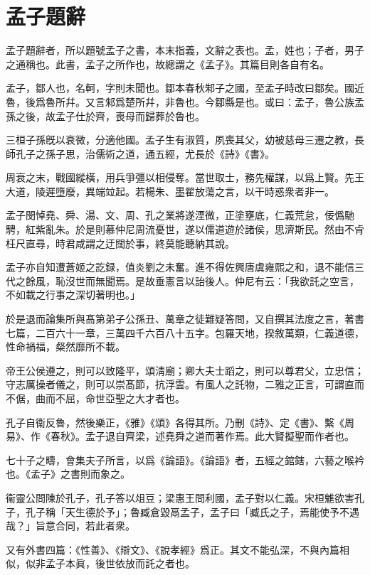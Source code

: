 \chapter*{孟子題辭}

孟子題辭者，所以題號孟子之書，本末指義，文辭之表也。孟，姓也；子者，男子之通稱也。此書，孟子之所作也，故總謂之《孟子》。其篇目則各自有名。

孟子，鄒人也，名軻，字則未聞也。鄒本春秋邾子之國，至孟子時改曰鄒矣。國近魯，後爲魯所幷。又言邾爲楚所幷，非魯也。今鄒縣是也。或曰：孟子，魯公族孟孫之後，故孟子仕於齊，喪母而歸葬於魯也。

三桓子孫旣以衰微，分適他國。孟子生有淑質，夙喪其父，幼被慈母三遷之教，長師孔子之孫子思，治儒術之道，通五經，尤長於《詩》《書》。

周衰之末，戰國縱橫，用兵爭彊以相侵奪。當世取士，務先權謀，以爲上賢。先王大道，陵遲墮廢，異端竝起。若楊朱、墨翟放蕩之言，以干時惑衆者非一。

孟子閔悼堯、舜、湯、文、周、孔之業將遂湮微，正塗壅底，仁義荒怠，佞僞馳騁，紅紫亂朱。於是則慕仲尼周流憂世，遂以儒道遊於諸侯，思濟斯民。然由不肻枉尺直尋，時君咸謂之迂闊於事，終莫能聽納其說。

孟子亦自知遭蒼姬之訖録，值炎劉之未奮。進不得佐興唐虞雍熙之和，退不能信三代之餘風，恥沒世而無聞焉。是故垂憲言以詒後人。仲尼有云：「我欲託之空言，不如載之行事之深切著明也。」

於是退而論集所與髙第弟子公孫丑、萬章之徒難疑答問，又自撰其法度之言，著書七篇，二百六十一章，三萬四千六百八十五字。包羅天地，揆敘萬類，仁義道德，性命禍福，粲然靡所不載。

帝王公侯遵之，則可以致隆平，頌淸廟；卿大夫士蹈之，則可以尊君父，立忠信；守志厲操者儀之，則可以崇髙節，抗浮雲。有風人之託物，二雅之正言，可謂直而不倨，曲而不屈，命世亞聖之大才者也。

孔子自衞反魯，然後樂正，《雅》《頌》各得其所。乃刪《詩》、定《書》、繫《周易》、作《春秋》。孟子退自齊梁，述堯舜之道而著作焉。此大賢擬聖而作者也。

七十子之疇，會集夫子所言，以爲《論語》。《論語》者，五經之錧鎋，六藝之喉衿也。《孟子》之書則而象之。

衞靈公問陳於孔子，孔子答以俎豆；梁惠王問利國，孟子對以仁義。宋桓魋欲害孔子，孔子稱「天生德於予」；魯臧倉毀鬲孟子，孟子曰「臧氏之子，焉能使予不遇哉？」旨意合同，若此者衆。

又有外書四篇：《性善》、《辯文》、《說孝經》爲正。其文不能弘深，不與內篇相似，似非孟子本眞，後世依放而託之者也。


